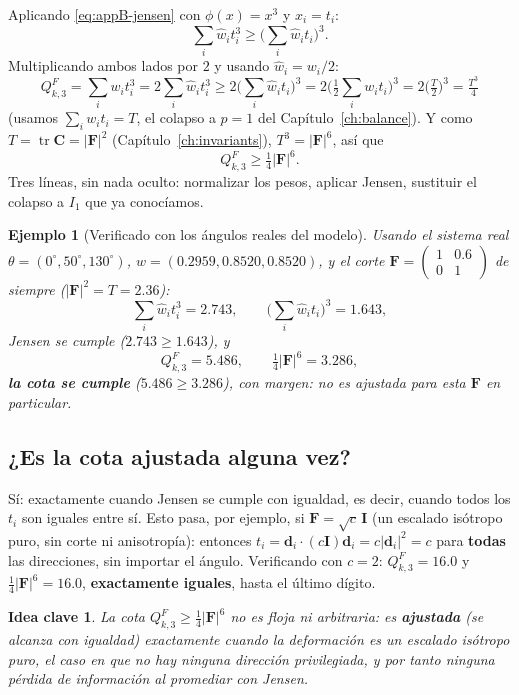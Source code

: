 \documentclass[11pt,a4paper]{article}
\newtheorem{takeaway}{Idea clave}
\newtheorem{ejemplo}{Ejemplo}
\newcommand{\tr}{\operatorname{tr}}
\begin{document}
Aplicando \eqref{eq:appB-jensen} con $\phi(x)=x^3$ y $x_i=t_i$:
\[
 \sum_i\hat w_it_i^3\geq\Big(\sum_i\hat w_it_i\Big)^3.
\]
Multiplicando ambos lados por $2$ y usando $\hat w_i=w_i/2$:
\[
 Q_{k,3}^F=\sum_iw_it_i^3=2\sum_i\hat w_it_i^3
 \geq2\Big(\sum_i\hat w_it_i\Big)^3
 =2\Big(\tfrac12\sum_iw_it_i\Big)^3
 =2\Big(\tfrac{T}{2}\Big)^3=\tfrac{T^3}{4}
\]
(usamos $\sum_iw_it_i=T$, el colapso a $p=1$ del
Cap\'itulo~\ref{ch:balance}). Y como $T=\tr\bm C=|\bm F|^2$
(Cap\'itulo~\ref{ch:invariants}), $T^3=|\bm F|^6$, as\'i que
\begin{equation}
 Q_{k,3}^F\geq\tfrac14|\bm F|^6.
 \label{eq:appB-growth-F}
\end{equation}
Tres l\'ineas, sin nada oculto: normalizar los pesos, aplicar Jensen,
sustituir el colapso a $I_1$ que ya conoc\'iamos.

\begin{ejemplo}[Verificado con los \'angulos reales del modelo]
\label{ex:appB-growth}
Usando el sistema real $\theta=(0^\circ,50^\circ,130^\circ)$,
$w=(0.2959,0.8520,0.8520)$, y el corte
$\bm F=\begin{pmatrix}1&0.6\\0&1\end{pmatrix}$ de siempre
($|\bm F|^2=T=2.36$):
\[
 \sum_i\hat w_it_i^3=2.743,\qquad
 \Big(\sum_i\hat w_it_i\Big)^3=1.643,
\]
Jensen se cumple ($2.743\geq1.643$), y
\[
 Q_{k,3}^F=5.486,\qquad \tfrac14|\bm F|^6=3.286,
\]
\textbf{la cota se cumple} ($5.486\geq3.286$), con margen: no es
ajustada para esta $\bm F$ en particular.
\end{ejemplo}

\subsection{¿Es la cota ajustada alguna vez?}

S\'i: exactamente cuando Jensen se cumple con igualdad, es decir,
cuando todos los $t_i$ son iguales entre s\'i. Esto pasa, por ejemplo,
si $\bm F=\sqrt{c}\,\bm I$ (un escalado is\'otropo puro, sin corte ni
anisotrop\'ia): entonces $t_i=\bm d_i\cdot(c\bm I)\bm d_i=c|\bm d_i|^2=c$
para \textbf{todas} las direcciones, sin importar el \'angulo.
Verificando con $c=2$: $Q_{k,3}^F=16.0$ y $\tfrac14|\bm F|^6=16.0$,
\textbf{exactamente iguales}, hasta el \'ultimo d\'igito.

\begin{takeaway}
La cota $Q_{k,3}^F\geq\tfrac14|\bm F|^6$ no es floja ni arbitraria:
es \textbf{ajustada} (se alcanza con igualdad) exactamente cuando la
deformaci\'on es un escalado is\'otropo puro, el caso en que no hay
ninguna direcci\'on privilegiada, y por tanto ninguna p\'erdida de
informaci\'on al promediar con Jensen.
\end{takeaway}
\end{document}
